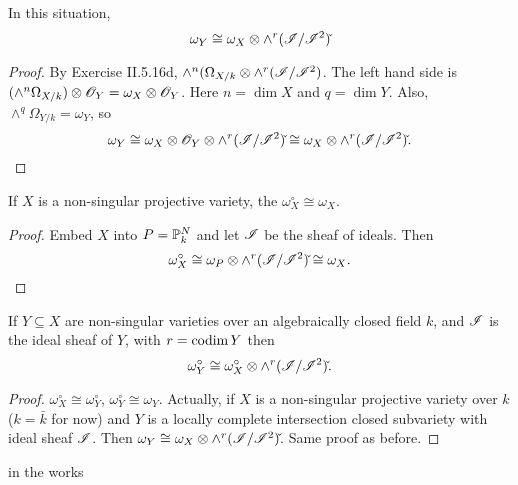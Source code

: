  \setcounter{lecture}{22}

\begin{corollary} In this situation,
 \[
 \omega_Y \cong \omega_X\otimes \wedge^r (\I/\I^2)\check{}
 \]
 \end{corollary}
 \begin{proof}
 By Exercise II.5.16d, $\wedge^n(\Omega_{X/k} \otimes
 \wedge^r(\I/\I^2)$.  The left hand side is $(\wedge^n
 \Omega_{X/k}) \otimes \O_Y = \omega_X\otimes \O_Y$.  Here $n=\dim
 X$ and $q=\dim Y$.  Also, $\wedge^q\Omega_{Y/k} = \omega_Y$, so
 \[
    \omega_Y \cong \omega_X\otimes \O_Y\otimes
    \wedge^r(\I/\I^2)\check{} \cong \omega_X \otimes
    \wedge^r(\I/\I^2)\check{}.
 \] \end{proof}

\begin{corollary} If $X$ is a non-singular projective variety, the
$\omega_X^{\circ} \cong \omega_X$. \end{corollary}
 \begin{proof}
 Embed $X$ into $P=\P^N_k$ and let $\I$ be the sheaf of ideals.
 Then
 \[
    \omega_X^{\circ} \cong \omega_P \otimes
    \wedge^r(\I/\I^2)\check{} \cong \omega_X.
 \]
 \end{proof}

 \begin{corollary}
 If $Y\subseteq X$ are non-singular varieties over an
 algebraically closed field $k$, and $\I$ is the ideal sheaf of
 $Y$, with $r=\codim Y$ then
 \[
    \omega_Y^{\circ} \cong \omega_X^{\circ} \otimes \wedge^r
    (\I/\I ^2)\check{}.
 \]
 \end{corollary}
 \begin{proof}
 $\omega_X^{\circ} \cong \omega_Y^{\circ}$, $\omega_Y^{\circ}
 \cong \omega_Y$.  Actually, if $X$ is a non-singular projective
 variety over $k$ ($k=\bar k$ for now) and $Y$ is a locally
 complete intersection closed subvariety with ideal sheaf $\I$.
 Then $\omega_Y\cong \omega_X\otimes \wedge^r(\I/\I^2)\check{}$.
 Same proof as before.
 \end{proof}

in the works

